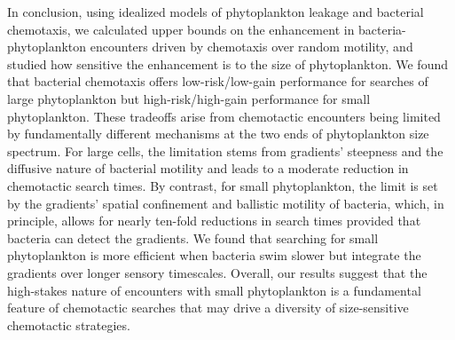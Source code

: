 \documentclass[9pt,twocolumn,twoside]{pnas-new}
\begin{document}
%
%


In conclusion, using idealized models of phytoplankton leakage and bacterial chemotaxis, we calculated upper bounds on the enhancement in bacteria-phytoplankton encounters driven by chemotaxis over random motility, and studied how sensitive the enhancement is to the size of phytoplankton. We found that bacterial chemotaxis offers low-risk/low-gain performance for searches of large phytoplankton but high-risk/high-gain performance for small phytoplankton. These tradeoffs arise from chemotactic encounters being limited by fundamentally different mechanisms at the two ends of phytoplankton size spectrum. For large cells, the limitation stems from gradients' steepness and the diffusive nature of bacterial motility and leads to a moderate reduction in chemotactic search times. By contrast, for small phytoplankton, the limit is set by the gradients' spatial confinement and ballistic motility of bacteria, which, in principle, allows for nearly ten-fold reductions in search times provided that bacteria can detect the gradients. We found that searching for small phytoplankton is more efficient when bacteria swim slower but integrate the gradients over longer sensory timescales. Overall, our results suggest that the high-stakes nature of encounters with small phytoplankton is a fundamental feature of chemotactic searches that may drive a diversity of size-sensitive chemotactic strategies.
\end{document}
